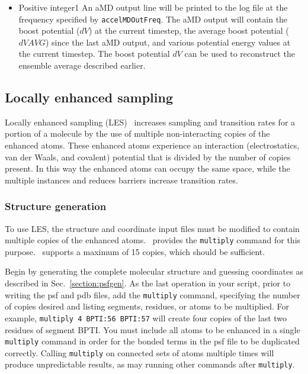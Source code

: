 \begin{itemize}
\item
{}
{Positive integer}{1}
{An aMD output line will be printed to the log file at the frequency specified by {\tt accelMDOutFreq}.
The aMD output will contain the boost potential ($dV$) at the current timestep, 
the average boost potential ($dVAVG$) since the last aMD output, and various potential energy values at the current timestep.
The boost potential $dV$ can be used to reconstruct the ensemble average described earlier.
}

\end{itemize}

\subsection{Locally enhanced sampling}
\label{section:les}

Locally enhanced sampling (LES)~\cite{ROIT91,SIMM98,SIMM00} increases
sampling and transition rates for a portion of a molecule by the use of
multiple non-interacting copies of the enhanced atoms.  These enhanced
atoms experience an interaction (electrostatics, van der Waals, and
covalent) potential that is divided by the number of copies present.
In this way the enhanced atoms can occupy the same space, while the
multiple instances and reduces barriers increase transition rates.

\subsubsection{Structure generation}

To use LES, the structure and coordinate input files must be modified to
contain multiple copies of the enhanced atoms.  \PSFGEN\ provides the
{\tt multiply} command for this purpose.  \NAMD\ supports a maximum of 15
copies, which should be sufficient.  

Begin by generating the complete molecular structure and guessing
coordinates as described in Sec.~\ref{section:psfgen}.  As the last
operation in your script, prior to writing the psf and pdb files, add
the {\tt multiply} command, specifying the number of copies desired and
listing segments, residues, or atoms to be multiplied.  For example,
\verb#multiply 4 BPTI:56 BPTI:57# will create four copies of the last
two residues of segment BPTI.  You must include all atoms to be
enhanced in a single {\tt multiply} command in order for the bonded
terms in the psf file to be duplicated correctly.  Calling {\tt multiply}
on connected sets of atoms multiple times will produce unpredictable
results, as may running other commands after {\tt multiply}.

